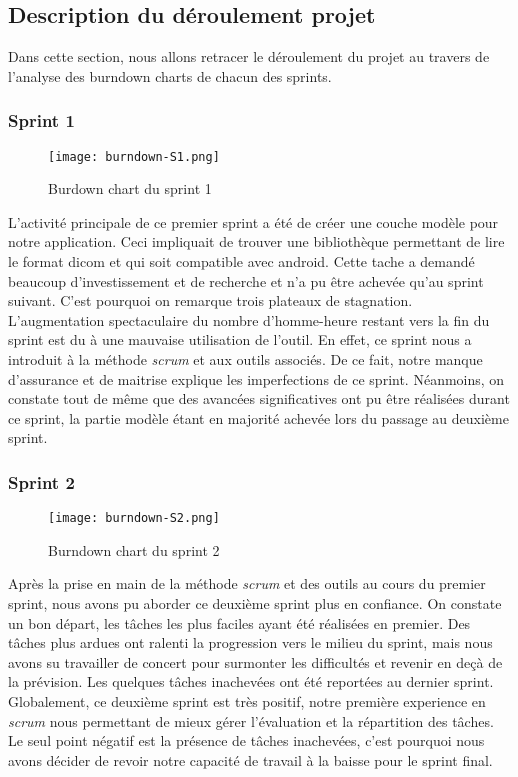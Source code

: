 \subsection{Description du déroulement projet}

Dans cette section, nous allons retracer le déroulement du projet au travers de l'analyse des burndown charts de chacun des sprints.

\subsubsection{Sprint 1}

\begin{figure}[h]
\begin{center}
	\texttt{[image: burndown-S1.png]}
\end{center}
	\caption{Burdown chart du sprint 1}
\end{figure}

L'activité principale de ce premier sprint a été de créer une couche modèle pour notre application. Ceci impliquait de trouver une bibliothèque permettant de lire le format dicom et qui soit compatible avec android. Cette tache a demandé beaucoup d'investissement et de recherche et n'a pu être achevée qu'au sprint suivant. C'est pourquoi on remarque trois plateaux de stagnation. L'augmentation spectaculaire du nombre d'homme-heure restant vers la fin du sprint est du à une mauvaise utilisation de l'outil. En effet, ce sprint nous a introduit à la méthode \emph{scrum} et aux outils associés. De ce fait, notre manque d'assurance et de maitrise explique les imperfections de ce sprint. Néanmoins, on constate tout de même que des avancées significatives ont pu être réalisées durant ce sprint, la partie modèle étant en majorité achevée lors du passage au deuxième sprint.

\subsubsection{Sprint 2}

\begin{figure}[h]
\begin{center}
	\texttt{[image: burndown-S2.png]}
\end{center}
	\caption{Burndown chart du sprint 2}
\end{figure}

Après la prise en main de la méthode \emph{scrum} et des outils au cours du premier sprint, nous avons pu aborder ce deuxième sprint plus en confiance. On constate un bon départ, les tâches les plus faciles ayant été réalisées en premier. Des tâches plus ardues ont ralenti la progression vers le milieu du sprint, mais nous avons su travailler de concert pour surmonter les difficultés et revenir en deçà de la prévision. Les quelques tâches inachevées ont été reportées au dernier sprint. Globalement, ce deuxième sprint est très positif, notre première experience en \emph{scrum} nous permettant de mieux gérer l'évaluation et la répartition des tâches. Le seul point négatif est la présence de tâches inachevées, c'est pourquoi nous avons décider de revoir notre capacité de travail à la baisse pour le sprint final.

